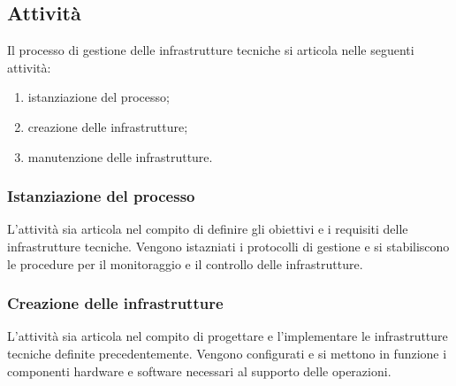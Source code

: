 \subsection{Attività}
Il processo di gestione delle infrastrutture tecniche si articola nelle seguenti attività:
\begin{enumerate}
    \item istanziazione del processo;
    \item creazione delle infrastrutture;
    \item manutenzione delle infrastrutture.
\end{enumerate}
\subsubsection{Istanziazione del processo}
L'attività sia articola nel compito di definire gli obiettivi e i requisiti delle infrastrutture tecniche. Vengono istazniati i protocolli di gestione e si stabiliscono le procedure per il monitoraggio e il controllo delle infrastrutture.

\subsubsection{Creazione delle infrastrutture}
L'attività sia articola nel compito di progettare e l'implementare le infrastrutture tecniche definite precedentemente. Vengono configurati e si mettono in funzione i componenti hardware e software necessari al supporto delle operazioni.

